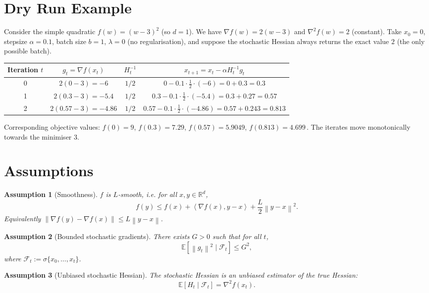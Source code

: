 \documentclass{article}
\newtheorem{assumption}{Assumption}
\newcommand{\R}{\mathbb{R}}
\newcommand{\norm}[1]{\left\|#1\right\|}
\newcommand{\ip}[2]{\left\langle #1,#2\right\rangle}
\begin{document}
\section*{Dry Run Example}
Consider the simple quadratic $f(w)=(w-3)^2$ (so $d=1$).  
We have $\nabla f(w)=2(w-3)$ and $\nabla^{2}f(w)=2$ (constant).  
Take $x_0=0$, stepsize $\alpha=0.1$, batch size $b=1$, $\lambda=0$ (no regularisation), and suppose the stochastic Hessian always returns the exact value $2$ (the only possible batch).

\begin{center}
\begin{tabular}{c|c|c|c}
Iteration $t$ & $g_t= \nabla f(x_t)$ & $H_t^{-1}$ & $x_{t+1}=x_t-\alpha H_t^{-1}g_t$\\ \hline
0 & $2(0-3)=-6$ & $1/2$ & $0-0.1\cdot\frac{1}{2}\cdot(-6)=0+0.3=0.3$\\
1 & $2(0.3-3)=-5.4$ & $1/2$ & $0.3-0.1\cdot\frac{1}{2}\cdot(-5.4)=0.3+0.27=0.57$\\
2 & $2(0.57-3)=-4.86$ & $1/2$ & $0.57-0.1\cdot\frac{1}{2}\cdot(-4.86)=0.57+0.243=0.813$\\
\end{tabular}
\end{center}
Corresponding objective values:
$f(0)=9$, $f(0.3)=7.29$, $f(0.57)=5.9049$, $f(0.813)=4.699\,.$  
The iterates move monotonically towards the minimiser $3$.

\newpage
\section*{Assumptions}
\begin{assumption}[Smoothness]\label{ass:smooth}
$f$ is $L$‑smooth, i.e. for all $x,y\in\R^{d}$,
\[
f(y)\le f(x)+\ip{\nabla f(x)}{y-x}+\frac{L}{2}\norm{y-x}^{2}.
\]
Equivalently $\norm{\nabla f(y)-\nabla f(x)}\le L\norm{y-x}$.
\end{assumption}

\begin{assumption}[Bounded stochastic gradients]\label{ass:gradbound}
There exists $G>0$ such that for all $t$,
\[
\mathbb{E}\!\left[\norm{g_t}^{2}\mid \mathcal{F}_t\right]\le G^{2},
\]
where $\mathcal{F}_t:=\sigma\{x_0,\dots,x_t\}$.
\end{assumption}

\begin{assumption}[Unbiased stochastic Hessian]\label{ass:unbiasedH}
The stochastic Hessian is an unbiased estimator of the true Hessian:
\[
\mathbb{E}\!\left[H_t\mid \mathcal{F}_t\right]=\nabla^{2}f(x_t).
\]
\end{assumption}
\end{document}
